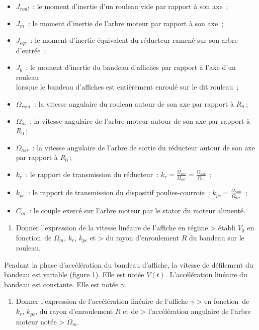 \begin{itemize}
\item
  \(J_{roul}\)~: le moment d'inertie d'un rouleau vide par rapport à son axe~;
\item
  \(J_{m}\)~: le moment d'inertie de l'arbre moteur par rapport à son axe~;
\item
  \(J_{eqr}\)~: le moment d'inertie équivalent du réducteur ramené sur son arbre\\
  d'entrée~;
\item
  \(J_{b}\)~: le moment d'inertie du bandeau d'affiches par rapport à l'axe d'un rouleau\\
  lorsque le bandeau d'affiches est entièrement enroulé sur le dit rouleau~;
\item
  \(\Omega_{roul}\)~: la vitesse angulaire du rouleau autour de son axe par rapport à \(R_{0}\ \);
\item
  \(\Omega_{m}\)~: la vitesse angulaire de l'arbre moteur autour de son axe par rapport à \(R_{0}\ \);
\item
  \(\Omega_{asr}\)~: la vitesse angulaire de l'arbre de sortie du réducteur autour de son axe\\
  par rapport à \(R_{0}\ \);
\item
  \(k_{r}\)~: le rapport de transmission du réducteur~: \(k_{r} = \frac{\Omega_{asr}}{\Omega_{aer}} = \frac{\Omega_{asr}}{\Omega_{m}}\)~;
\item
  \(k_{pc}\)~: le rapport de transmission du dispositif poulies-courroie~: \(k_{pc} = \frac{\Omega_{roul}}{\Omega_{asr}}\)~;
\item
  \(C_{m}\)~: le couple exercé sur l'arbre moteur par le stator du moteur alimenté.
\end{itemize}

\begin{enumerate}
\def\labelenumi{\arabic{enumi}.}
\tightlist
\item
  Donner l'expression de la vitesse linéaire de l'affiche en régime \textgreater{} établi \(V_{0}\) en fonction~de \(\Omega_{m}\), \(k_{r}\), \(k_{pc}\) et \textgreater{} du rayon d'enroulement \(R\) du bandeau sur le rouleau.
\end{enumerate}

Pendant la phase d'accélération du bandeau d'affiche, la vitesse de défilement du bandeau est variable (figure 1). Elle est notée \(V(t)\). L'accélération linéaire du bandeau est constante. Elle est notée \(\gamma\).

\begin{enumerate}
\def\labelenumi{\arabic{enumi}.}
\setcounter{enumi}{1}
\tightlist
\item
  Donner l'expression de l'accélération linéaire de l'affiche \(\gamma\) \textgreater{} en fonction~de \(k_{r}\), \(k_{pc}\), du rayon d'enroulement \(R\) et de \textgreater{} l'accélération angulaire de l'arbre moteur notée \textgreater{} \({\dot{\Omega}}_{m}\).
\end{enumerate}

